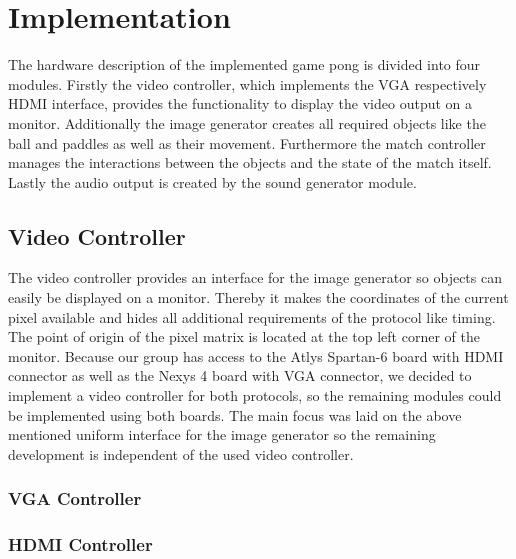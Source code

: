\newpage
\section{Implementation}
The hardware description of the implemented game pong is divided into four modules. Firstly the video controller, which implements the VGA respectively HDMI interface, provides the functionality to display the video output on a monitor. Additionally the image generator creates all required objects like the ball and paddles as well as their movement. Furthermore the match controller manages the interactions between the objects and the state of the match itself. Lastly the audio output is created by the sound generator module.
	\subsection{Video Controller}
    The video controller provides an interface for the image generator so objects can easily be displayed on a monitor. Thereby it makes the coordinates of the current pixel available and hides all additional requirements of the protocol like timing. The point of origin of the pixel matrix is located at the top left corner of the monitor. Because our group has access to the Atlys Spartan-6 board with HDMI connector as well as the Nexys 4 board with VGA connector, we decided to implement a video controller for both protocols, so the remaining modules could be implemented using both boards. The main focus was laid on the above mentioned uniform interface for the image generator so the remaining development is independent of the used video controller.
        \subsubsection{VGA Controller}
        \subsubsection{HDMI Controller}
